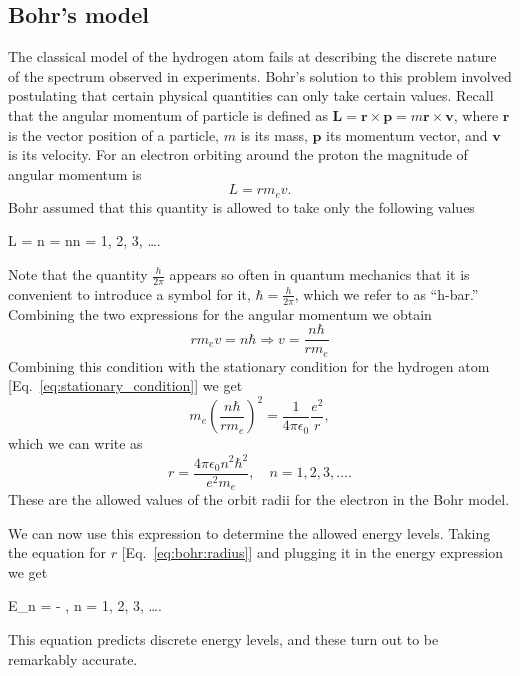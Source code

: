 \documentclass[../Main/chem331-notes.tex]{subfiles}
\begin{document}
\subsection{Bohr's model}
The classical model of the hydrogen atom fails at describing the discrete nature of the spectrum observed in experiments.
Bohr's solution to this problem involved postulating that certain physical quantities can only take certain values.
Recall that the angular momentum of particle is defined as $\mathbf{L} = \mathbf{r} \times \mathbf{p} = m \mathbf{r} \times \mathbf{v}$, where $\mathbf{r}$ is the vector position of a particle, $m$ is its mass, $\mathbf{p}$ its momentum vector, and $\mathbf{v}$ is its velocity.
For an electron orbiting around the proton the magnitude of angular momentum is
\begin{equation}
L = r m_e v.
\end{equation}
Bohr assumed that this quantity is allowed to take only the following values
\begin{iequation}
L = n  = n\hbar \quad n = 1, 2, 3, \ldots.
\end{iequation}
Note that the quantity $\frac{h}{2\pi}$ appears so often in quantum mechanics that it is convenient to introduce a symbol for it, $\hbar = \frac{h}{2\pi}$, which we refer to as ``h-bar.''
Combining the two expressions for the angular momentum we obtain
\begin{equation}
r m_e v = n\hbar \Rightarrow v = \frac{n\hbar}{r m_e}
\end{equation}
Combining this condition with the stationary condition for the hydrogen atom [Eq.~\eqref{eq:stationary_condition}] we get
\begin{equation}
m_e \left(\frac{n\hbar}{r m_e}\right)^2 = \frac{1}{4 \pi \epsilon_0} \frac{e^2}{r},
\end{equation}
which we can write as
\begin{equation}
\label{eq:bohr:radius}
r = \frac{4 \pi \epsilon_0 n^2\hbar^2}{e^2 m_e}, \quad n = 1, 2, 3, \ldots .
\end{equation}
These are the allowed values of the orbit radii for the electron in the Bohr model.

We can now use this expression to determine the allowed energy levels.
Taking the equation for $r$ [Eq.~\eqref{eq:bohr:radius}] and plugging it in the energy expression we get
\begin{iequation}
E_n = - , \quad n = 1, 2, 3, \ldots .
\end{iequation}
This equation predicts discrete energy levels, and these turn out to be remarkably accurate.
\end{document}
